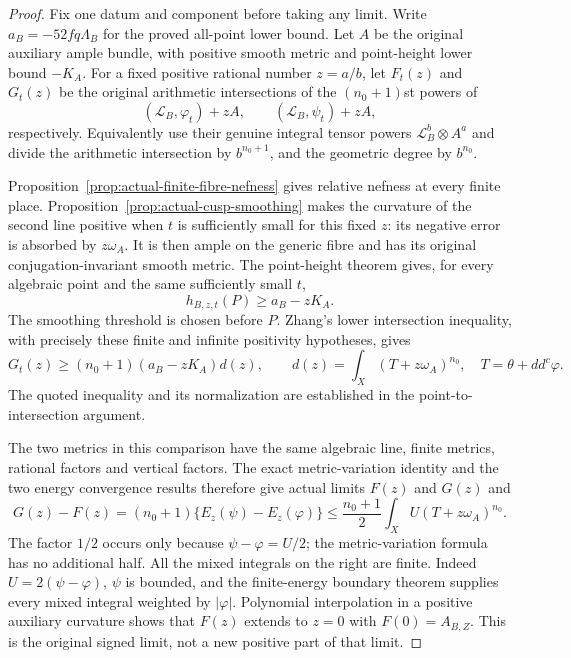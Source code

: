 \begin{proof}
Fix one datum and component before taking any limit.  Write
$a_B=-52fq\Lambda_B$ for the proved all-point lower bound.
Let $A$ be the original auxiliary ample bundle, with positive
smooth metric and point-height lower bound $-K_A$.  For a fixed
positive rational number $z=a/b$, let $F_t(z)$ and $G_t(z)$ be
the original arithmetic intersections of the $(n_0+1)$st powers
of
\[
       (\mathcal L_B,\varphi_t)+zA,
                   \qquad (\mathcal L_B,\psi_t)+zA,
\]
respectively.  Equivalently use their genuine integral tensor
powers $\mathcal L_B^b\otimes A^a$ and divide the arithmetic
intersection by $b^{n_0+1}$, and the geometric degree by $b^{n_0}$.

Proposition~\ref{prop:actual-finite-fibre-nefness} gives relative
nefness at every finite place.  Proposition~\ref{prop:actual-cusp-smoothing}
makes the curvature of the second line positive when $t$ is
sufficiently small for this fixed $z$: its negative error is
absorbed by $z\omega_A$.  It is then ample on the generic fibre
and has its original conjugation-invariant smooth metric.
The point-height theorem gives, for every algebraic point and
the same sufficiently small $t$,
\[
                       h_{B,z,t}(P)\ge a_B-zK_A.
 \tag{HA17}
\]
The smoothing threshold is chosen before $P$.  Zhang's lower
intersection inequality, with precisely these finite and infinite
positivity hypotheses, gives
\[
         G_t(z)\ge(n_0+1)(a_B-zK_A)d(z),
 \qquad
 d(z)=\int_X(T+z\omega_A)^{n_0},\quad T=\theta+dd^c\varphi.
 \tag{HA18}
\]
The quoted inequality and its normalization are established in
the point-to-intersection argument\cite{height-assembly-height-record}.

The two metrics in this comparison have the same algebraic line,
finite metrics, rational factors and vertical factors.  The exact
metric-variation identity and the two energy convergence results
therefore give actual limits $F(z)$ and $G(z)$ and
\[
 G(z)-F(z)=(n_0+1)\{E_z(\psi)-E_z(\varphi)\}
       \le\frac{n_0+1}{2}\int_X U(T+z\omega_A)^{n_0}.
 \tag{HA19}
\]
The factor $1/2$ occurs only because $\psi-\varphi=U/2$;
the metric-variation formula has no additional half.
All the mixed integrals on the right are finite.  Indeed
$U=2(\psi-\varphi)$, $\psi$ is bounded, and the finite-energy
boundary theorem supplies every mixed integral weighted by
$|\varphi|$.  Polynomial interpolation in a positive auxiliary
curvature shows that $F(z)$ extends to $z=0$ with
$F(0)=A_{B,Z}$.  This is the original signed limit, not a new
positive part of that limit.


\end{proof}
